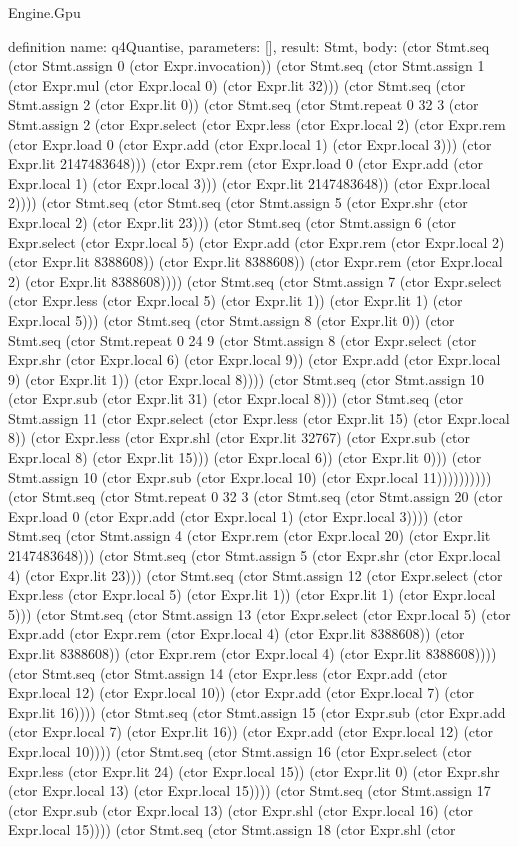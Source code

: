 \begin{lexlean}{Engine.Gpu}
\begin{semanticmodule}
definition{
  name: q4Quantise,
  parameters: [],
  result: Stmt,
  body: (ctor Stmt.seq (ctor Stmt.assign 0 (ctor Expr.invocation)) (ctor Stmt.seq (ctor Stmt.assign 1 (ctor Expr.mul (ctor Expr.local 0) (ctor Expr.lit 32))) (ctor Stmt.seq (ctor Stmt.assign 2 (ctor Expr.lit 0)) (ctor Stmt.seq (ctor Stmt.repeat 0 32 3 (ctor Stmt.assign 2 (ctor Expr.select (ctor Expr.less (ctor Expr.local 2) (ctor Expr.rem (ctor Expr.load 0 (ctor Expr.add (ctor Expr.local 1) (ctor Expr.local 3))) (ctor Expr.lit 2147483648))) (ctor Expr.rem (ctor Expr.load 0 (ctor Expr.add (ctor Expr.local 1) (ctor Expr.local 3))) (ctor Expr.lit 2147483648)) (ctor Expr.local 2)))) (ctor Stmt.seq (ctor Stmt.seq (ctor Stmt.assign 5 (ctor Expr.shr (ctor Expr.local 2) (ctor Expr.lit 23))) (ctor Stmt.seq (ctor Stmt.assign 6 (ctor Expr.select (ctor Expr.local 5) (ctor Expr.add (ctor Expr.rem (ctor Expr.local 2) (ctor Expr.lit 8388608)) (ctor Expr.lit 8388608)) (ctor Expr.rem (ctor Expr.local 2) (ctor Expr.lit 8388608)))) (ctor Stmt.seq (ctor Stmt.assign 7 (ctor Expr.select (ctor Expr.less (ctor Expr.local 5) (ctor Expr.lit 1)) (ctor Expr.lit 1) (ctor Expr.local 5))) (ctor Stmt.seq (ctor Stmt.assign 8 (ctor Expr.lit 0)) (ctor Stmt.seq (ctor Stmt.repeat 0 24 9 (ctor Stmt.assign 8 (ctor Expr.select (ctor Expr.shr (ctor Expr.local 6) (ctor Expr.local 9)) (ctor Expr.add (ctor Expr.local 9) (ctor Expr.lit 1)) (ctor Expr.local 8)))) (ctor Stmt.seq (ctor Stmt.assign 10 (ctor Expr.sub (ctor Expr.lit 31) (ctor Expr.local 8))) (ctor Stmt.seq (ctor Stmt.assign 11 (ctor Expr.select (ctor Expr.less (ctor Expr.lit 15) (ctor Expr.local 8)) (ctor Expr.less (ctor Expr.shl (ctor Expr.lit 32767) (ctor Expr.sub (ctor Expr.local 8) (ctor Expr.lit 15))) (ctor Expr.local 6)) (ctor Expr.lit 0))) (ctor Stmt.assign 10 (ctor Expr.sub (ctor Expr.local 10) (ctor Expr.local 11)))))))))) (ctor Stmt.seq (ctor Stmt.repeat 0 32 3 (ctor Stmt.seq (ctor Stmt.assign 20 (ctor Expr.load 0 (ctor Expr.add (ctor Expr.local 1) (ctor Expr.local 3)))) (ctor Stmt.seq (ctor Stmt.assign 4 (ctor Expr.rem (ctor Expr.local 20) (ctor Expr.lit 2147483648))) (ctor Stmt.seq (ctor Stmt.assign 5 (ctor Expr.shr (ctor Expr.local 4) (ctor Expr.lit 23))) (ctor Stmt.seq (ctor Stmt.assign 12 (ctor Expr.select (ctor Expr.less (ctor Expr.local 5) (ctor Expr.lit 1)) (ctor Expr.lit 1) (ctor Expr.local 5))) (ctor Stmt.seq (ctor Stmt.assign 13 (ctor Expr.select (ctor Expr.local 5) (ctor Expr.add (ctor Expr.rem (ctor Expr.local 4) (ctor Expr.lit 8388608)) (ctor Expr.lit 8388608)) (ctor Expr.rem (ctor Expr.local 4) (ctor Expr.lit 8388608)))) (ctor Stmt.seq (ctor Stmt.assign 14 (ctor Expr.less (ctor Expr.add (ctor Expr.local 12) (ctor Expr.local 10)) (ctor Expr.add (ctor Expr.local 7) (ctor Expr.lit 16)))) (ctor Stmt.seq (ctor Stmt.assign 15 (ctor Expr.sub (ctor Expr.add (ctor Expr.local 7) (ctor Expr.lit 16)) (ctor Expr.add (ctor Expr.local 12) (ctor Expr.local 10)))) (ctor Stmt.seq (ctor Stmt.assign 16 (ctor Expr.select (ctor Expr.less (ctor Expr.lit 24) (ctor Expr.local 15)) (ctor Expr.lit 0) (ctor Expr.shr (ctor Expr.local 13) (ctor Expr.local 15)))) (ctor Stmt.seq (ctor Stmt.assign 17 (ctor Expr.sub (ctor Expr.local 13) (ctor Expr.shl (ctor Expr.local 16) (ctor Expr.local 15)))) (ctor Stmt.seq (ctor Stmt.assign 18 (ctor Expr.shl (ctor }
\end{semanticmodule}
\end{lexlean}

